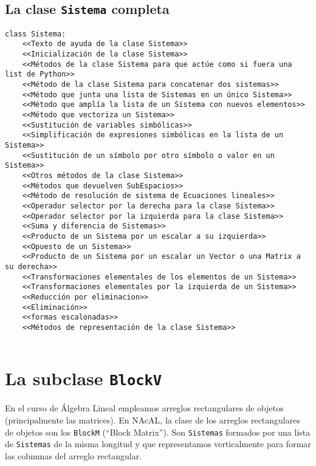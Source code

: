 \documentclass[11pt]{report}
\begin{document}
\clearpage

\section{La clase \texttt{Sistema} completa}
\label{sec:orgab26353}

\begin{verbatim}
class Sistema:
    <<Texto de ayuda de la clase Sistema>>
    <<Inicialización de la clase Sistema>>
    <<Métodos de la clase Sistema para que actúe como si fuera una list de Python>>
    <<Método de la clase Sistema para concatenar dos sistemas>>
    <<Método que junta una lista de Sistemas en un único Sistema>>
    <<Método que amplía la lista de un Sistema con nuevos elementos>>
    <<Método que vectoriza un Sistema>>
    <<Sustitución de variables simbólicas>>
    <<Simplificación de expresiones simbólicas en la lista de un Sistema>>
    <<Sustitución de un símbolo por otro símbolo o valor en un Sistema>>
    <<Otros métodos de la clase Sistema>>
    <<Métodos que devuelven SubEspacios>>
    <<Método de resolución de sistema de Ecuaciones lineales>>
    <<Operador selector por la derecha para la clase Sistema>>
    <<Operador selector por la izquierda para la clase Sistema>>
    <<Suma y diferencia de Sistemas>>
    <<Producto de un Sistema por un escalar a su izquierda>>
    <<Opuesto de un Sistema>>
    <<Producto de un Sistema por un escalar un Vector o una Matrix a su derecha>>
    <<Transformaciones elementales de los elementos de un Sistema>>
    <<Transformaciones elementales por la izquierda de un Sistema>>
    <<Reducción por eliminacion>>
    <<Eliminación>>
    <<formas escalonadas>>
    <<Métodos de representación de la clase Sistema>>
    
\end{verbatim}


\chapter{La subclase \texttt{BlockV}}
\label{sec:orgcbf84f2}

En el curso de Álgebra Lineal empleamos arreglos rectangulares de
objetos (principalmente las matrices). En NAcAL, la clase de los
arreglos rectangulares de objetos son los \texttt{BlockM} (``Block
Matrix''). Son \texttt{Sistemas} formados por una lista de \texttt{Sistemas} de la
misma longitud y que representamos verticalmente para formar las
columnas del arreglo rectangular.
\end{document}
